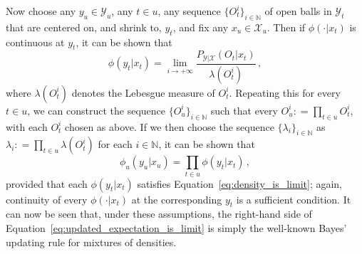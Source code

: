 \documentclass[twoside,11pt]{article}
\newcommand{\nats}{\mathbb{N}}
\newcommand{\states}{\mathcal{X}}
\newcommand{\observs}{\mathcal{Y}}
\newcommand{\coloneqq}{:\!=}
\begin{document}
Now choose any $y_u\in\observs_u$, any $t\in u$, any sequence $\{O_t^i\}_{i\in\nats}$ of open balls in $\observs_t$ that are centered on, and shrink to, $y_t$, and fix any $x_u\in\states_u$. Then if $\phi(\cdot\vert x_t)$ is continuous at $y_t$, it can be shown that
\begin{equation}\label{eq:density_is_limit}
\phi(y_t\vert x_t) = \lim_{i\to+\infty} \frac{P_{\observs\vert\states}(O_t\vert x_t)}{\lambda(O_t^i)}\,,
\end{equation}
where $\lambda(O_t^i)$ denotes the Lebesgue measure of $O_t^i$. Repeating this for every $t\in u$, we can construct the sequence $\{O_u^i\}_{i\in\nats}$ such that every $O_u^i\coloneqq \prod_{t\in u}O_t^i$, with each $O_t^i$ chosen as above. If we then choose the sequence $\{\lambda_i\}_{i\in\nats}$ as $\lambda_i\coloneqq \prod_{t\in u}\lambda(O_t^i)$ for each $i\in\nats$, it can be shown that
\begin{equation*}
\phi_u(y_u\vert x_u) = \prod_{t\in u}\phi(y_t\vert x_t)\,,
\end{equation*}
provided that each $\phi(y_t\vert x_t)$ satisfies Equation~\eqref{eq:density_is_limit}; again, continuity of every $\phi(\cdot \vert x_t)$ at the corresponding $y_t$ is a sufficient condition.
%
It can now be seen that, under these assumptions, the right-hand side of Equation~\eqref{eq:updated_expectation_is_limit} is simply the well-known Bayes' updating rule for mixtures of densities. 
\end{document}
